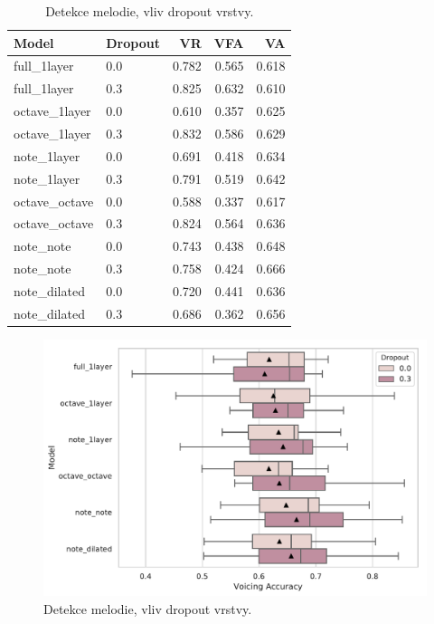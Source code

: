 \begin{table}[h!]
\centering
    \begin{tabular}{llrrr}
    \toprule
            Model & Dropout &    VR &   VFA &    VA \\
    \midrule
    full\_1layer &     0.0 & 0.782 & 0.565 & 0.618 \\
    full\_1layer &     0.3 & 0.825 & 0.632 & 0.610 \\
    octave\_1layer &     0.0 & 0.610 & 0.357 & 0.625 \\
    octave\_1layer &     0.3 & 0.832 & 0.586 & 0.629 \\
    note\_1layer &     0.0 & 0.691 & 0.418 & 0.634 \\
    note\_1layer &     0.3 & 0.791 & 0.519 & 0.642 \\
    octave\_octave &     0.0 & 0.588 & 0.337 & 0.617 \\
    octave\_octave &     0.3 & 0.824 & 0.564 & 0.636 \\
        note\_note &     0.0 & 0.743 & 0.438 & 0.648 \\
        note\_note &     0.3 & 0.758 & 0.424 & 0.666 \\
    note\_dilated &     0.0 & 0.720 & 0.441 & 0.636 \\
    note\_dilated &     0.3 & 0.686 & 0.362 & 0.656 \\
    \bottomrule
    \end{tabular}
\caption{Detekce melodie, vliv dropout vrstvy.}\label{tab:voicing_dropout}
\end{table}

\begin{figure}[h]\centering
    \includegraphics[scale=0.6]{../img/figures/voicing_dropout}
\caption{Detekce melodie, vliv dropout vrstvy.}\label{obr:voicing_dropout}
\end{figure}

